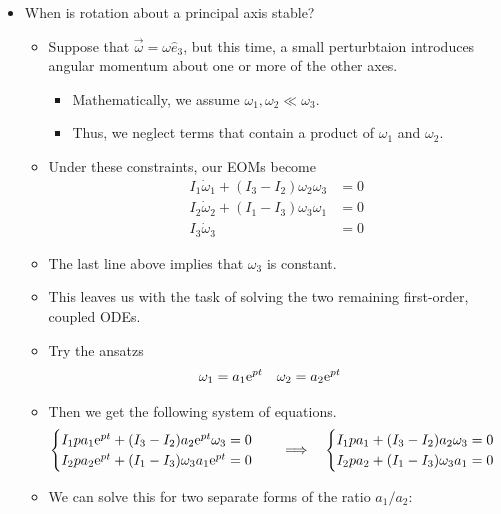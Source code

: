 \documentclass[../notes.tex]{subfiles}
\begin{document}
\begin{itemize}
    \item When is rotation about a principal axis stable?
    \begin{itemize}
        \item Suppose that $\vec{\omega}=\omega\hat{e}_3$, but this time, a small perturbtaion introduces angular momentum about one or more of the other axes.
        \begin{itemize}
            \item Mathematically, we assume $\omega_1,\omega_2\ll\omega_3$.
            \item Thus, we neglect terms that contain a product of $\omega_1$ and $\omega_2$.
        \end{itemize}
        \item Under these constraints, our EOMs become
        \begin{align*}
            I_1\dot{\omega}_1+(I_3-I_2)\omega_2\omega_3 &= 0\\
            I_2\dot{\omega}_2+(I_1-I_3)\omega_3\omega_1 &= 0\\
            I_3\dot{\omega}_3 &= 0
        \end{align*}
        \item The last line above implies that $\omega_3$ is constant.
        \item This leaves us with the task of solving the two remaining first-order, coupled ODEs.
        \item Try the ansatzs
        \begin{align*}
            \omega_1 &= a_1\e[pt]&
            \omega_2 &= a_2\e[pt]
        \end{align*}
        \item Then we get the following system of equations.
        \begin{equation*}
            \begin{cases}
                I_1pa_1\e[pt]+(I_3-I_2)a_2\e[pt]\omega_3 = 0\\
                I_2pa_2\e[pt]+(I_1-I_3)\omega_3a_1\e[pt] = 0
            \end{cases}
            \quad\Longrightarrow\quad
            \begin{cases}
                I_1pa_1+(I_3-I_2)a_2\omega_3 = 0\\
                I_2pa_2+(I_1-I_3)\omega_3a_1 = 0
            \end{cases}
        \end{equation*}
        \item We can solve this for two separate forms of the ratio $a_1/a_2$:

\end{itemize}
\end{itemize}
\end{document}
